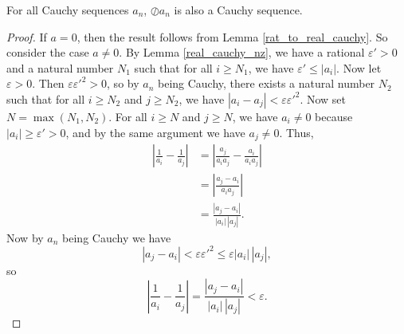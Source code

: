 \documentclass[../../math.tex]{subfiles}
\begin{document}
\begin{lemma}
    For all Cauchy sequences $a_n$, $\oslash a_n$ is also a Cauchy sequence.
\end{lemma}
\begin{proof}
    If $a = 0$, then the result follows from Lemma \ref{rat_to_real_cauchy}.  So
    consider the case $a \neq 0$.  By Lemma \ref{real_cauchy_nz}, we have a
    rational $\varepsilon' > 0$ and a natural number $N_1$ such that for all $i
    \geq N_1$, we have $\varepsilon' \leq |a_i|$.  Now let $\varepsilon > 0$.
    Then $\varepsilon \varepsilon'^2 > 0$, so by $a_n$ being Cauchy, there
    exists a natural number $N_2$ such that for all $i \geq N_2$ and $j \geq
    N_2$, we have $|a_i - a_j| < \varepsilon\varepsilon'^2$.  Now set $N =
    \max(N_1, N_2)$.  For all $i \geq N$ and $j \geq N$, we have $a_i \neq 0$
    because $|a_i| \geq \varepsilon' > 0$, and by the same argument we have $a_j
    \neq 0$.  Thus,
    \begin{align*}
        \left|\frac{1}{a_i} - \frac{1}{a_j}\right|
        &= \left|\frac{a_j}{a_ia_j} - \frac{a_i}{a_ia_j}\right| \\
        &= \left|\frac{a_j - a_i}{a_ia_j}\right| \\
        &= \frac{|a_j - a_i|}{|a_i|\,|a_j|}.
    \end{align*}
    Now by $a_n$ being Cauchy we have
    \[
        |a_j - a_i| < \varepsilon \varepsilon'^2
        \leq \varepsilon |a_i|\,|a_j|,
    \]
    so
    \[
        \left|\frac{1}{a_i} - \frac{1}{a_j}\right|
        = \frac{|a_j - a_i|}{|a_i|\,|a_j|}
        < \varepsilon.
    \]
\end{proof}
\end{document}

